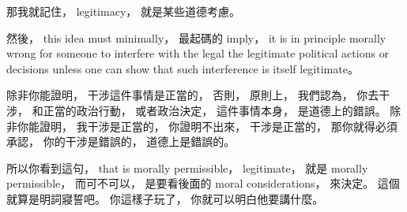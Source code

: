 \hypertarget{w02:cue:1019}{}那我就記住，
\hypertarget{w02:cue:1020}{}legitimacy，
\hypertarget{w02:cue:1021}{}就是某些道德考慮。

\hypertarget{w02:cue:1022}{}然後，
\hypertarget{w02:cue:1023}{}this idea must minimally，
\hypertarget{w02:cue:1024}{}最起碼的 imply，
\hypertarget{w02:cue:1025}{}it is in principle morally wrong
\hypertarget{w02:cue:1026}{}for someone to interfere with the legal
\hypertarget{w02:cue:1027}{}the legitimate political actions
\hypertarget{w02:cue:1028}{}or decisions
\hypertarget{w02:cue:1029}{}unless one can show that such interference
\hypertarget{w02:cue:1030}{}is itself legitimate。

\hypertarget{w02:cue:1031}{}除非你能證明，
\hypertarget{w02:cue:1032}{}干涉這件事情是正當的，
\hypertarget{w02:cue:1033}{}否則，
\hypertarget{w02:cue:1034}{}原則上，
\hypertarget{w02:cue:1035}{}我們認為，
\hypertarget{w02:cue:1036}{}你去干涉，
\hypertarget{w02:cue:1037}{}和正當的政治行動，
\hypertarget{w02:cue:1038}{}或者政治決定，
\hypertarget{w02:cue:1039}{}這件事情本身，
\hypertarget{w02:cue:1040}{}是道德上的錯誤。
\hypertarget{w02:cue:1041}{}除非你能證明，
\hypertarget{w02:cue:1042}{}我干涉是正當的，
\hypertarget{w02:cue:1043}{}你證明不出來，
\hypertarget{w02:cue:1044}{}干涉是正當的，
\hypertarget{w02:cue:1045}{}那你就得必須承認，
\hypertarget{w02:cue:1046}{}你的干涉是錯誤的，
\hypertarget{w02:cue:1047}{}道德上是錯誤的。

\hypertarget{w02:cue:1048}{}所以你看到這句，
\hypertarget{w02:cue:1049}{}that is morally permissible，
\hypertarget{w02:cue:1050}{}legitimate，
\hypertarget{w02:cue:1051}{}就是 morally permissible，
\hypertarget{w02:cue:1052}{}而可不可以，
\hypertarget{w02:cue:1053}{}是要看後面的 moral considerations，
\hypertarget{w02:cue:1054}{}來決定。
\hypertarget{w02:cue:1055}{}這個就算是明詞寢誓吧。
\hypertarget{w02:cue:1056}{}你這樣子玩了，
\hypertarget{w02:cue:1057}{}你就可以明白他要講什麼。

